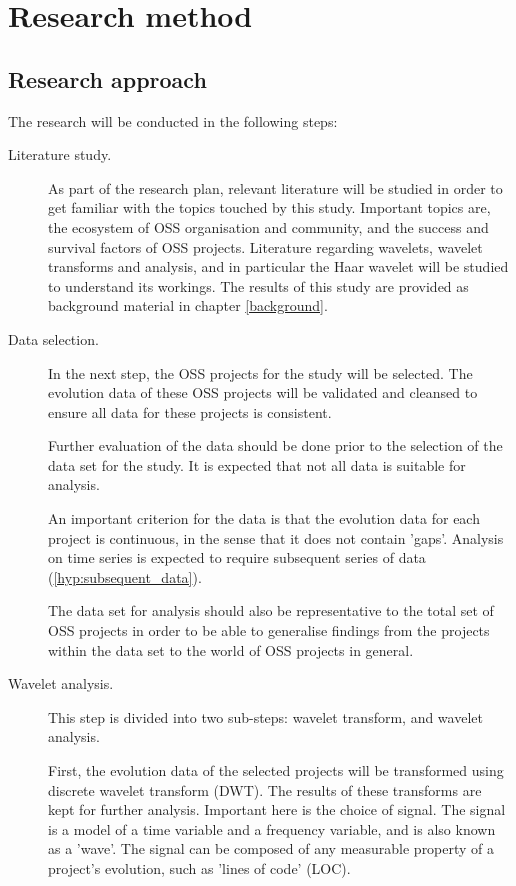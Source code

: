 \chapter{Research method}
\label{method}

\section{Research approach}
The research will be conducted in the following steps:
\begin{description}
	\item[Literature study.] As part of the research plan, relevant literature will
	be studied in order to get familiar with the topics touched by this
	study. Important topics are, the ecosystem of OSS organisation and community,
	and the success and survival factors of OSS projects. Literature regarding
	wavelets, wavelet transforms and analysis, and in particular the Haar wavelet
	will be studied to understand its workings. The results of this study are
	provided as background material in chapter \ref{background}.
	
	\item[Data selection.] In the next step, the OSS projects for the study will be
	selected. The evolution data of these OSS projects will be validated and
	cleansed to ensure all data for these projects is consistent.
	
	Further evaluation of the data should be done prior to the selection of the
	data set for the study. It is expected that not all data is suitable for
	analysis.
	
	An important criterion for the data is that the evolution data for each project
	is continuous, in the sense that it does not contain 'gaps'. Analysis on time
	series is expected to require subsequent series of data
	(\ref{hyp:subsequent_data}).
	
	The data set for analysis should also be representative to the total set of
	OSS projects in order to be able to generalise findings from the
	projects within the data set to the world of OSS projects in general.
	
	\item[Wavelet analysis.] This step is divided into two sub-steps: wavelet
	transform, and wavelet analysis.
	
	First, the evolution data of the selected projects will be transformed using
	discrete wavelet transform (DWT). The results of these transforms are kept for
	further analysis. Important here is the choice of signal. The signal is a
	model of a time variable and a frequency variable, and is also known as a
	'wave'. The signal can be composed of any measurable property of a project's
	evolution, such as 'lines of code' (LOC).
	

\end{description}
